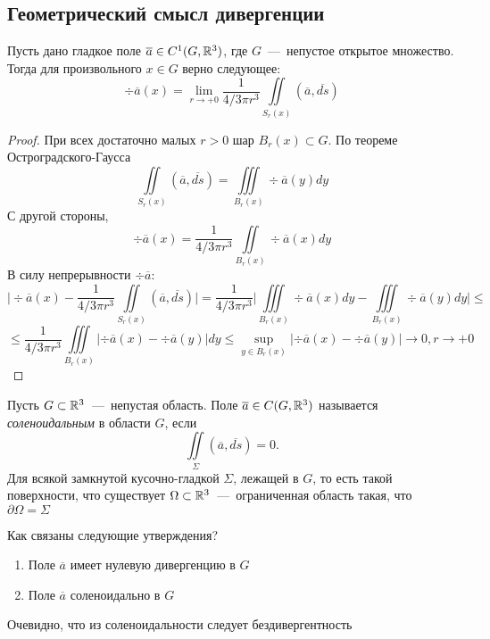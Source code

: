 \subsection{Геометрический смысл дивергенции}
\begin{theorem}
    Пусть дано гладкое поле $\overline{a} \in C^1(G, \mathbb{R}^3)$, где $G$~---~непустое открытое множество. Тогда для произвольного $x \in G$ верно следующее: \[\div \overline{a}(x) = \lim\limits_{r \rightarrow +0} \dfrac{1}{4/3\pi r^3} \iint\limits_{S_r(x)}(\overline{a}, \overline{ds})\]
\end{theorem}
\begin{proof}
    При всех достаточно малых $r > 0$ шар $B_r(x) \subset G$. По теореме Остроградского-Гаусса \[\iint\limits_{S_r(x)} (\overline{a}, \overline{ds}) = \iiint\limits_{B_r(x)}\div \overline{a}(y)dy\]
    С другой стороны, \[\div \overline{a}(x) = \dfrac{1}{4/3\pi r^3}\iint\limits_{B_r(x)}\div \overline{a}(x)dy\]
    В силу непрерывности $\div \overline{a}$: \[\biggr|\div\overline{a}(x) - \dfrac{1}{4/3 \pi r^3}\iint\limits_{S_r(x)}(\overline{a}, \overline{ds})\biggr| = \dfrac{1}{4/3 \pi r^3}\biggr| \iiint\limits_{B_r(x)}\div\overline{a}(x)dy - \iiint\limits_{B_r(x)}\div\overline{a}(y)dy\biggr| \leq \]\[\leq \dfrac{1}{4/3 \pi r^3}\iiint\limits_{B_r(x)}|\div\overline{a}(x) - \div\overline{a}(y)|dy \leq \sup\limits_{y \in B_r(x)}|\div\overline{a}(x) - \div\overline{a}(y)| \rightarrow 0, r \rightarrow +0\]
\end{proof}
\begin{definition}
    Пусть $G \subset \mathbb{R}^3$~---~непустая область. Поле $\overline{a} \in C(G, \mathbb{R}^3)$ называется \textit{соленоидальным} в области $G$, если \[\iint\limits_\Sigma (\overline{a}, \overline{ds}) = 0.\]
    Для всякой замкнутой кусочно-гладкой $\Sigma$, лежащей в $G$, то есть такой поверхности, что существует $\Omega \subset \mathbb{R}^3$~---~ограниченная область такая, что $\partial \Omega = \Sigma$
\end{definition}
\begin{question}
    Как связаны следующие утверждения?
    \begin{enumerate}
        \item Поле $\overline{a}$ имеет нулевую дивергенцию в $G$
        \item Поле $\overline{a}$ соленоидально в $G$
    \end{enumerate}
\end{question}
\begin{lemma}
    Очевидно, что из соленоидальности следует бездивергентность
\end{lemma}
